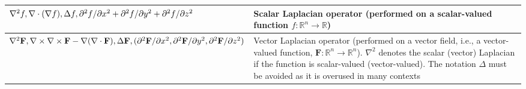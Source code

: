 \documentclass{article}
\begin{document}
\begin{xltabular}{\textwidth}{XX}
	\(\nabla^2 f, \nabla \cdot (\nabla f), \Delta f, \newline \partial^2f/\partial x^2 + \partial^2f/\partial y^2 + \partial^2f/\partial z^2\)                                                                                                 & Scalar Laplacian operator (performed on a scalar-valued function \(f: \mathbb{R}^{n} \rightarrow \mathbb{R}\))                                                                                                                                                                                                                      \\ \hline
	\(\nabla^2 \mathbf{F}, \nabla \times \nabla \times \mathbf{F} - \nabla(\nabla \cdot \mathbf{F}), \Delta \mathbf{F}, \newline (\partial^2\mathbf{F}/\partial x^2 , \partial^2\mathbf{F}/\partial y^2 , \partial^2\mathbf{F}/\partial z^2)\) & Vector Laplacian operator (performed on a vector field, i.e., a vector-valued function, \(\mathbf{F}: \mathbb{R}^{n} \rightarrow \mathbb{R}^{n}\)). \(\nabla^2\) denotes the scalar (vector) Laplacian if the function is scalar-valued (vector-valued). The notation \(\Delta\) must be avoided as it is overused in many contexts \\
\end{xltabular}
\end{document}
